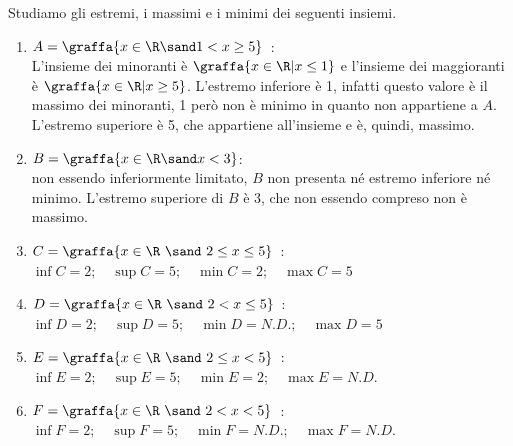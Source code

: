 \begin{esempio}Studiamo gli estremi, i massimi e i minimi dei seguenti 
insiemi. %
\begin{enumerate}
\item \(A = \graffa{x\in\R \sand 1 < x \geq 5}\)~: \\
L'insieme dei minoranti è \(\graffa{x\in\R\vert x \leq 1}\) e
l'insieme dei maggioranti è \(\graffa{x\in\R\vert x \geq 5}\).
L'estremo inferiore è 1, infatti questo valore è il massimo 
dei minoranti, 1 però non è minimo in quanto non appartiene a \(A\). 
L'estremo superiore è 5, che appartiene all'insieme e è, quindi, massimo. 
\item \(B =\graffa{x \in \R \sand x < 3}\): \\
non essendo inferiormente limitato, \(B\) non presenta né estremo inferiore né 
minimo. 
L'estremo superiore di \(B\) è 3, che non essendo compreso non è massimo.
\item \(C = \graffa{x\in\R~\sand~ 2 \leq x \leq 5}\)~: \\
\(\inf{C} = 2; \quad \sup{C} = 5; \quad \min{C} = 2; \quad \max{C} = 5\) 
\item \(D = \graffa{x\in\R~\sand~ 2 < x \leq 5}\)~: \\
\(\inf{D} = 2; \quad \sup{D} = 5; \quad \min{D} = N.D.; \quad \max{D} = 5\)
\item \(E = \graffa{x\in\R~\sand~ 2 \leq x < 5}\)~: \\
\(\inf{E} = 2; \quad \sup{E} = 5; \quad \min{E} = 2; \quad \max{E} = N.D.\)
\item \(F = \graffa{x\in\R~\sand~ 2 < x < 5}\)~: \\
\(\inf{F} = 2; \quad \sup{F} = 5; \quad \min{F} = N.D.; \quad \max{F} = N.D.\)
\end{enumerate}
\end{esempio}

